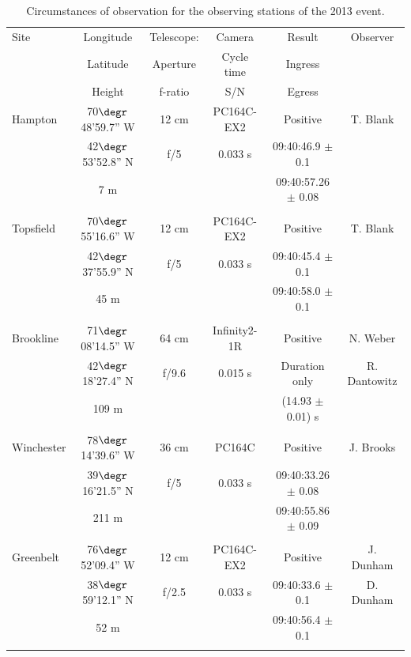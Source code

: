\documentclass[useAMS,usenatbib]{mn2e}
\begin{document}
\begin{table}
 \centering
 \begin{minipage}{140mm}
  \caption{Circumstances of observation for the observing stations of the 2013 event.\label{Tab: obs-2013}}
  \begin{tabular}{@{}lccccc}
  \hline
     Site & Longitude & Telescope: & Camera  & Result & Observer  \\
          & Latitude  & Aperture  & Cycle time & Ingress & \\          
          & Height    & f-ratio    &    S/N    & Egress    & \\          
\hline
 Hampton & 70$\degr$48'59.7'' W & 12 cm & PC164C-EX2 & Positive & T. Blank \\
  &42$\degr$53'52.8'' N & f/5 & 0.033 s     & 09:40:46.9 $\pm$ 0.1 &   \\
            & 7 m       &  &     & 09:40:57.26  $\pm$ 0.08 &   \\
 & & & & & \\
 Topsfield & 70$\degr$55'16.6'' W & 12 cm & PC164C-EX2 & Positive & T. Blank \\
  &42$\degr$37'55.9'' N & f/5      & 0.033 s   & 09:40:45.4 $\pm$ 0.1 &   \\
            & 45 m      &  &     & 09:40:58.0  $\pm$ 0.1 &   \\
 & & & & & \\
 Brookline & 71$\degr$08'14.5'' W & 64 cm & Infinity2-1R & Positive & N. Weber \\
  &42$\degr$18'27.4'' N & f/9.6 & 0.015 s     & Duration only &  R. Dantowitz  \\
            & 109 m     &       &     & (14.93 $\pm$ 0.01) s &   \\
 & & & & & \\
 Winchester & 78$\degr$14'39.6'' W & 36 cm & PC164C & Positive & J. Brooks \\
  &39$\degr$16'21.5'' N & f/5 & 0.033 s    & 09:40:33.26 $\pm$ 0.08 &   \\
            & 211 m     &  &     & 09:40:55.86  $\pm$ 0.09 &   \\
 & & & & & \\
 Greenbelt & 76$\degr$52'09.4'' W & 12 cm & PC164C-EX2 & Positive & J. Dunham \\
  &38$\degr$59'12.1'' N & f/2.5 & 0.033 s    & 09:40:33.6 $\pm$ 0.1 & D. Dunham  \\
            & 52 m      &   &     & 09:40:56.4  $\pm$ 0.1 &   \\
 & & & & & \\

\end{tabular}
\end{minipage}
\end{table}
\end{document}
